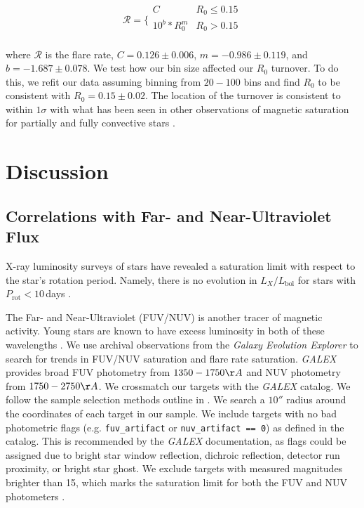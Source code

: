 \documentclass[twocolumn]{aastex631}
\begin{document}
\begin{equation}
  \mathcal{R} =
  \Bigg \{
  \begin{array}{ll}
        C & R_0 \leq 0.15 \\
        10^b * R_0^m  & R_0 > 0.15 \\
  \end{array}
\end{equation}

where $\mathcal{R}$ is the flare rate, $C = 0.126 \pm 0.006$, $m = -0.986 \pm 0.119$, and $b = -1.687 \pm 0.078$.
We test how our bin size affected our $R_0$ turnover. To do this, we refit our data assuming binning from $20 - 100$
bins and find $R_0$ to be consistent with $R_0 = 0.15 \pm 0.02$. The location of the turnover is consistent to
within $1\sigma$ with what has been seen in other observations of magnetic saturation for partially and
fully convective stars \citep[e.g. $L_X/L_\textrm{bol}$; ][]{wright18}.

\section{Discussion}\label{sec:discuss}


\subsection{Correlations with Far- and Near-Ultraviolet Flux}

X-ray luminosity surveys of stars have revealed a saturation limit with respect to
the star's rotation period. Namely, there is no evolution in $L_X/L_\textrm{bol}$ for
stars with $P_\textrm{rot} < 10$\,days \citep{Pizzolato03}.

The Far- and Near-Ultraviolet (FUV/NUV) is another tracer of magnetic activity. Young
stars are known to have excess luminosity in both of these wavelengths \citep{}. We use
archival observations from the \textit{Galaxy Evolution Explorer}
\citep[\textit{GALEX};][]{martin05} to search for trends in FUV/NUV saturation and flare
rate saturation. \textit{GALEX} provides broad FUV photometry from $1350-1750 \AA$
and NUV photometry from $1750-2750 \AA$. We crossmatch our targets with the \textit{GALEX}
catalog. We follow the sample selection methods outline in \citep{schneider18}. We search
a $10''$ radius around the coordinates of each target in our sample. We include targets with
no bad photometric flags (e.g. \texttt{fuv\_artifact} or \texttt{nuv\_artifact == 0}) as defined
in the catalog. This is recommended by the \textit{GALEX} documentation, as flags could be
assigned due to bright star window reflection, dichroic reflection, detector run proximity,
or bright star ghost. We exclude targets with measured magnitudes brighter than 15, which
marks the saturation limit for both the FUV and NUV photometers \citep{morrissey07}.
\end{document}
